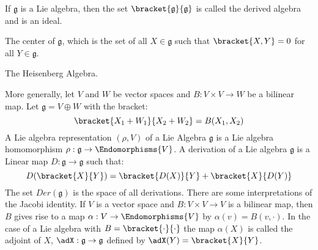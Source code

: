 \documentclass{book}                                                            %
\begin{document}
                \begin{example}
                    If $\mathfrak{g}$ is a Lie algebra, then the set
                    $\bracket{\mathfrak{g}}{\mathfrak{g}}$ is called the derived
                    algebra and is an ideal.
                \end{example}
                \begin{example}
                    The center of $\mathfrak{g}$, which is the set of all
                    $X\in\mathfrak{g}$ such that $\bracket{X,Y}=0$ for all
                    $Y\in\mathfrak{g}$.
                \end{example}
                \begin{example}
                    The Heisenberg Algebra.
                \end{example}
                More generally, let $V$ and $W$ be vector spaces and
                $B:V\times{V}\rightarrow{W}$ be a bilinear map. Let
                $\mathfrak{g}=V\oplus{W}$ with the bracket:
                \begin{equation}
                    \bracket{X_{1}+W_{1}}{X_{2}+W_{2}}=B(X_{1},X_{2})
                \end{equation}
                A Lie algebra representation $(\rho,V)$ of a Lie Algebra
                $\mathfrak{g}$ is a Lie algebra homomorphism
                $\rho:\mathfrak{g}\rightarrow\Endomorphisms{V}$. A derivation of
                a Lie algebra $\mathfrak{g}$ is a Linear map
                $D:\mathfrak{g}\rightarrow\mathfrak{g}$ such that:
                \begin{equation}
                    D(\bracket{X}{Y})=\bracket{D(X)}{Y}+\bracket{X}{D(Y)}
                \end{equation}
                The set $Der(\mathfrak{g})$ is the space of all derivations.
                There are some interpretations of the Jacobi identity. If $V$ is
                a vector space and $B:V\times{V}\rightarrow{V}$ is a bilinear
                map, then $B$ gives rise to a map
                $\alpha:V\rightarrow\Endomorphisms{V}$ by
                $\alpha(v)=B(v,\cdot)$. In the case of a Lie algebra with
                $B=\bracket{\cdot}{\cdot}$ the map $\alpha(X)$ is called the
                adjoint of $X$, $\adX:\mathfrak{g}\rightarrow\mathfrak{g}$
                defined by $\adX(Y)=\bracket{X}{Y}$.
\end{document}

